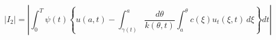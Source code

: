 \documentclass{article}
\begin{document}
\[
  |I_2|=\left| \int_{0}^T \psi(t) 
           \left\{ 
              u(a,t)-
              \int_{\gamma(t)}^a 
              \frac{d\theta}{k(\theta,t)}
              \int_{a}^\theta c(\xi)u_t(\xi,t)\,d\xi
           \right\} dt
        \right|
\]
\pagebreak
\end{document}
